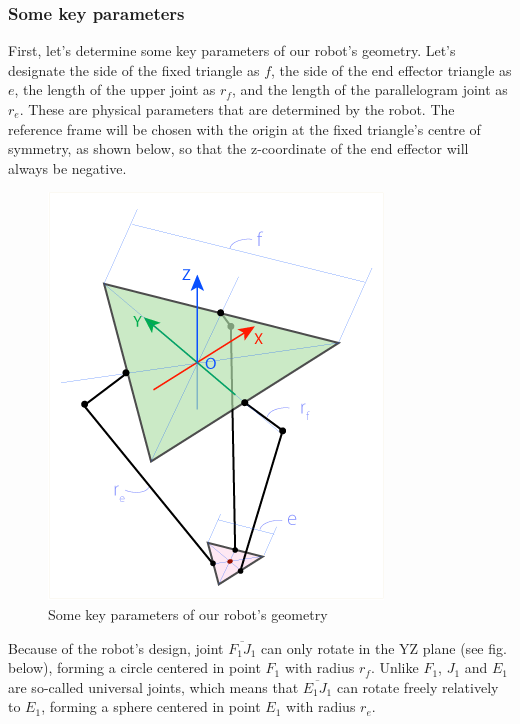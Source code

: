 \subsubsection{Some key parameters}

First, let's determine some key parameters of our robot's geometry. Let's designate the side of the fixed triangle as $f$, the side of the end effector triangle as $e$, the length of the upper joint as $r_{f}$,  and the length of the parallelogram joint as $r_{e}$. These are physical parameters that are determined by the robot. The reference frame will be chosen with the origin at the fixed triangle's centre of symmetry, as shown below, so that the z-coordinate of the end effector will always be negative.
\begin{figure}[H]
	\centering
	\includegraphics[width=\maxwidth{11cm}, keepaspectratio]{Chapters/Fig/key_parameters.png}
	\caption{Some key parameters of our robot's geometry}
	\label{fig:key_parameters}
\end{figure}
Because of the robot's design, joint $\overline{F_{1}J_{1}}$ can only rotate in the YZ plane (see fig. below), forming a circle centered in point $F_{1}$ with radius $r_{f}$. Unlike $F_{1}$, $J_{1}$ and $E_{1}$ are so-called universal joints, which means that $\overline{E_{1}J_{1}}$ can rotate freely relatively to $E_{1}$, forming a sphere centered in point $E_{1}$ with radius $r_{e}$.
